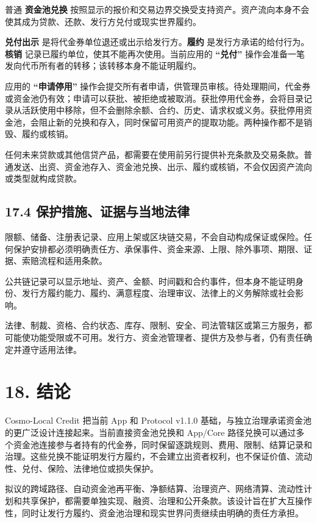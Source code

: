 \documentclass[11pt]{article}
\begin{document}
普通 \textbf{资金池兑换} 按照显示的报价和交易边界交换受支持资产。资产流向本身不会使其成为贷款、还款、发行方兑付或现实世界履约。

\textbf{兑付出示} 是将代金券单位退还或出示给发行方。\textbf{履约} 是发行方承诺的给付行为。\textbf{核销} 记录已履约单位，使其不能再次使用。当前应用的 \textbf{``兑付''} 操作会准备一笔发向代币所有者的转移；该转移本身不能证明履约。

应用的 \textbf{``申请停用''} 操作会提交所有者申请，供管理员审核。待处理期间，代金券或资金池仍有效；申请可以获批、被拒绝或被取消。获批停用代金券，会将目录记录从活跃使用中移除，但不会删除余额、合约、历史、请求权或义务。获批停用资金池，会阻止新的兑换和存入，同时保留可用资产的提取功能。两种操作都不是销毁、履约或核销。

任何未来贷款或其他信贷产品，都需要在使用前另行提供补充条款及交易条款。普通发送、出资、资金池存入、资金池兑换、出示、履约或核销，不会仅因资产流向或类型就构成贷款。

\subsection*{17.4 保护措施、证据与当地法律}

限额、储备、注册表记录、应用上架或区块链交易，不会自动构成保证或保险。任何保护安排都必须明确责任方、承保事件、资金来源、上限、除外事项、期限、证据、索赔流程和适用条款。

公共链记录可以显示地址、资产、金额、时间戳和合约事件，但本身不能证明身份、发行方履约能力、履约、满意程度、治理审议、法律上的义务解除或社会影响。

法律、制裁、资格、合约状态、库存、限制、安全、司法管辖区或第三方服务，都可能使功能受限或不可用。发行方、资金池管理者、提供方及参与者，仍有责任确定并遵守适用法律。


\section*{18. 结论}

Cosmo-Local Credit 把当前 App 和 Protocol v1.1.0 基础，与独立治理承诺资金池的更广泛设计连接起来。当前直接资金池兑换和 App/Core 路径兑换可以通过多个资金池连接参与者持有的代金券，同时保留逐跳规则、费用、限制、结算记录和治理。这些兑换不能证明发行方履约，不会建立出资者权利，也不保证价值、流动性、兑付、保险、法律地位或损失保护。

拟议的跨域路径、自动资金池再平衡、净额结算、治理资产、网络清算、流动性计划和共享保护，都需要单独实现、融资、治理和公开条款。该设计旨在扩大互操作性，同时让发行方履约、资金池治理和现实世界问责继续由明确的责任方承担。
\end{document}
